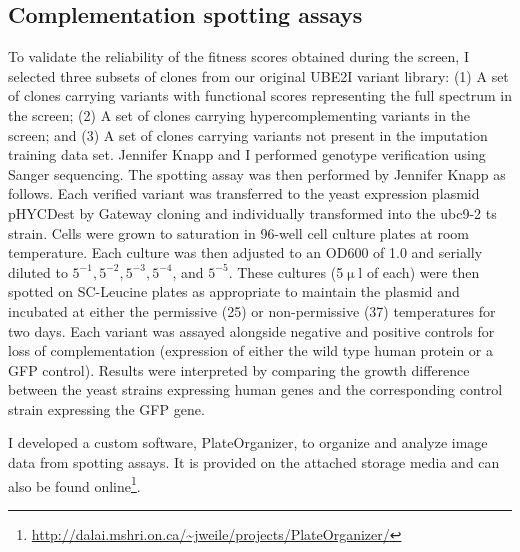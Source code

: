 \subsection{Complementation spotting assays}
To validate the reliability of the fitness scores obtained during the screen, I selected  three subsets of clones from our original UBE2I variant library: (1) A set of clones carrying variants with functional scores representing the full spectrum in the screen; (2) A set of clones carrying hypercomplementing variants in the screen; and (3) A set of clones carrying variants not present in the imputation training data set. 
Jennifer Knapp and I performed genotype verification using Sanger sequencing. The spotting assay was then performed by Jennifer Knapp as follows. Each verified variant was transferred to the yeast expression plasmid pHYCDest by Gateway cloning and individually transformed into the  ubc9-2 ts strain. Cells were grown to saturation in 96-well cell culture plates at room temperature.  Each culture was then adjusted to an OD600 of 1.0 and serially diluted to $5^{-1}, 5^{-2}, 5^{-3}, 5^{-4}$, and $5^{-5}$. These cultures (5$\upmu$l of each) were then spotted on SC-Leucine plates as appropriate to maintain the plasmid and incubated at either the permissive (25\celsius ) or non-permissive (37\celsius ) temperatures for two days. Each variant was assayed alongside negative and positive controls for loss of complementation (expression of either the wild type human protein or a GFP control). Results were interpreted by comparing the growth difference between the yeast strains expressing human genes and the corresponding control strain expressing the GFP gene.   

I developed a custom software, PlateOrganizer, to organize and analyze image data from spotting assays. It is provided on the attached storage media and can also be found online\footnote{\url{http://dalai.mshri.on.ca/~jweile/projects/PlateOrganizer/}}.

